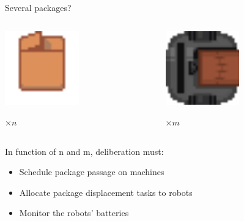 \begin{frame}{Several packages?}
    \begin{columns}
        \begin{column}{0.5\textwidth}
            \centering
            \includegraphics[width = 0.5\textwidth]{images/godot/package.png}
            
            \Large $\times n$
        \end{column}
        \begin{column}{0.5\textwidth}
            \centering
            \includegraphics[width = 0.5\textwidth]{images/godot/robot_texture.png}
            
            \LARGE $\times m$
        \end{column}
    \end{columns}
    
    In function of n and m, deliberation must:
    \begin{itemize}
        \item Schedule package passage on machines
        \item Allocate package displacement tasks to robots
        \item Monitor the robots' batteries 
    \end{itemize}
\end{frame}

